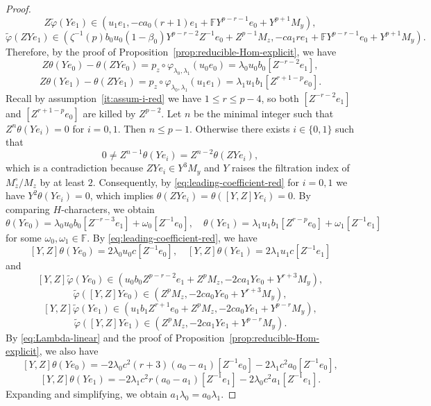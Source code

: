\documentclass[11pt,a4paper]{article} %
\def\FF{\mathbb{F}}
\begin{document}
\begin{proof}
\[    \]
    \[
    Z\widetilde{\varphi}(Ye_1)\in\left(u_1e_1,-ca_0(r+1)e_1+\FF Y^{p-r-1}e_0+Y^{p+1}M_y\right),
    \]
    \[
    \widetilde{\varphi}(ZYe_1)\in\left(\zeta^{-1}(p)b_0u_0(1-\beta_0)Y^{p-r-2}Z^{-1}e_0+Z^{p-1}M_z,-ca_1re_1+\FF Y^{p-r-1}e_0+Y^{p+1}M_y\right).
    \]
    Therefore, by the proof of Proposition~\ref{prop:reducible-Hom-explicit}, we have
    \[
    Z\theta(Ye_0)-\theta(ZYe_0)=p_z\circ\varphi_{\lambda_0,\lambda_1}(u_0e_0)=\lambda_0u_0b_0[Z^{-r-2}e_1],
    \]
    \[
    Z\theta(Ye_1)-\theta(ZYe_1)=p_z\circ\varphi_{\lambda_0,\lambda_1}(u_1e_1)=\lambda_1u_1b_1[Z^{r+1-p}e_0].
    \]
    Recall by assumption~\ref{it:assum-i-red} we have $1\le r\le p-4$, so both $[Z^{-r-2}e_1]$ and $[Z^{r+1-p}e_0]$ are killed by $Z^{p-2}$. Let $n$ be the minimal integer such that $Z^n\theta(Ye_i)=0$ for $i=0,1$. Then $n\le p-1$. Otherwise there exists $i\in\{0,1\}$ such that
    \[
    0\ne Z^{n-1}\theta(Ye_i)=Z^{n-2}\theta(ZYe_i),
    \]
    which is a contradiction because $ZYe_i\in Y^3M_y$ and $Y$ raises the filtration index of $M_z^\circ/M_z$ by at least $2$. Consequently, by \eqref{eq:leading-coefficient-red} for $i=0,1$ we have $Y^2\theta(Ye_i)=0$, which implies $\theta(ZYe_i)=\theta([Y,Z]Ye_i)=0$. By comparing $H$-characters, we obtain
    \[
    \theta(Ye_0)=\lambda_0u_0b_0[Z^{-r-3}e_1]+\omega_0[Z^{-1}e_0],\quad\theta(Ye_1)=\lambda_1u_1b_1[Z^{r-p}e_0]+\omega_1[Z^{-1}e_1]
    \]
    for some $\omega_0,\omega_1\in\FF$. By \eqref{eq:leading-coefficient-red}, we have
    \[
    [Y,Z]\theta(Ye_0)=2\lambda_0u_0c[Z^{-1}e_0],\quad[Y,Z]\theta(Ye_1)=2\lambda_1u_1c[Z^{-1}e_1]
    \]
    and
    \[
    [Y,Z]\widetilde{\varphi}(Ye_0)\in(u_0b_0Z^{p-r-2}e_1+Z^pM_z,-2ca_1Ye_0+Y^{r+3}M_y),
    \]
    \[
    \widetilde{\varphi}\left([Y,Z]Ye_0\right)\in\left(Z^pM_z,-2ca_0Ye_0+Y^{r+3}M_y\right),
    \]
    \[
    [Y,Z]\widetilde{\varphi}(Ye_1)\in\left(u_1b_1Z^{r+1}e_0+Z^pM_z,-2ca_0Ye_1+Y^{p-r}M_y\right),
    \]
    \[
    \widetilde{\varphi}\left([Y,Z]Ye_1\right)\in\left(Z^pM_z,-2ca_1Ye_1+Y^{p-r}M_y\right).
    \]
    By \eqref{eq:Lambda-linear} and the proof of Proposition~\ref{prop:reducible-Hom-explicit}, we also have
    \[
    [Y,Z]\theta(Ye_0)=-2\lambda_0c^2(r+3)(a_0-a_1)[Z^{-1}e_0]-2\lambda_1c^2a_0[Z^{-1}e_0],
    \]
    \[
    [Y,Z]\theta(Ye_1)=-2\lambda_1c^2r(a_0-a_1)[Z^{-1}e_1]-2\lambda_0c^2a_1[Z^{-1}e_1].
    \]
    Expanding and simplifying, we obtain $a_1\lambda_0=a_0\lambda_1$.


\end{proof}
\end{document}
